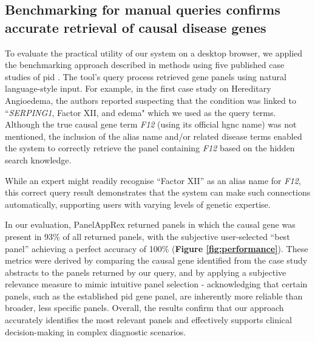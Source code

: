 \subsection{Benchmarking for manual queries confirms accurate retrieval of causal disease genes}
\noindent
To evaluate the practical utility of our system on a desktop browser, we applied the benchmarking approach described in methods using five published case studies of \ac{pid}
\cite{arruda_genetic_2015, 
mcaleer_severe_2015,
verhoeven_hematopoietic_2022,
magerus-chatinet_autoimmune_2013,
sharfe_fatal_2014}. %
The tool's query process retrieved gene panels using natural language-style input. 
For example, in the first case study on Hereditary Angioedema, the authors reported suspecting that the condition was linked to ``\textit{SERPING1}, Factor XII, and edema" which we used as the query terms. 
Although the true causal gene term \textit{F12} (using its official \ac{hgnc} name) was not mentioned, the inclusion of the alias name and/or related disease terms enabled the system to correctly retrieve the panel containing \textit{F12} based on the hidden search knowledge.

While an expert might readily recognise ``Factor XII'' as an alias name for \textit{F12}, this correct query result demonstrates that the system can make such connections automatically, supporting users with varying levels of genetic expertise.

In our evaluation, PanelAppRex returned panels in which the causal gene was present in 93\% of all returned panels, with the subjective user-selected ``best panel'' achieving a perfect accuracy of 100\% 
(\textbf{Figure \ref{fig:performance}}).
 These metrics were derived by comparing the causal gene identified from the case study abstracts to the panels returned by our query, and by applying a subjective relevance measure to mimic intuitive panel selection - acknowledging that certain panels, such as the established \ac{pid} gene panel, are inherently more reliable than broader, less specific panels.
Overall, the results confirm that our approach accurately identifies the most relevant panels and effectively supports clinical decision-making in complex diagnostic scenarios.

